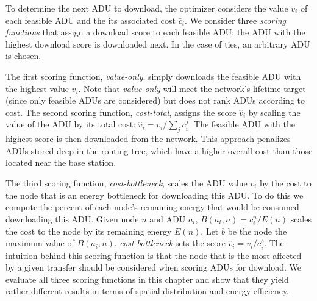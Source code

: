 To determine the next ADU to download, the optimizer considers the value
$v_i$ of each feasible ADU and the its associated cost $\bar{c}_i$. We
consider three \textit{scoring functions} that assign a download score to
each feasible ADU; the ADU with the highest download score is downloaded
next. In the case of ties, an arbitrary ADU is chosen.

The first scoring function, \textit{value-only}, simply downloads the
feasible ADU with the highest value $v_i$. Note that \textit{value-only} will
meet the network's lifetime target (since only feasible ADUs are considered)
but does not rank ADUs according to cost. The second scoring function,
\textit{cost-total}, assigns the score $\hat{v}_i$ by scaling the value of
the ADU by its total cost: $\hat{v}_i = v_i / \sum_j c_i^j$. The feasible ADU
with the highest score is then downloaded from the network. This approach
penalizes ADUs stored deep in the routing tree, which have a higher overall
cost than those located near the base station.

The third scoring function, \textit{cost-bottleneck}, scales the ADU value
$v_i$ by the cost to the node that is an energy bottleneck for downloading
this ADU. To do this we compute the percent of each node's remaining energy
that would be consumed downloading this ADU. Given node $n$ and ADU $a_i$,
$B(a_i,n) = c_i^n / E(n)$ scales the cost to the node by its remaining energy
$E(n)$. Let $b$ be the node the maximum value of $B(a_i,n)$.
\textit{cost-bottleneck} sets the score $\hat{v}_i = v_i / c_i^b$. The
intuition behind this scoring function is that the node that is the most
affected by a given transfer should be considered when scoring ADUs for
download. We evaluate all three scoring functions in this chapter and show
that they yield rather different results in terms of spatial distribution and
energy efficiency.
